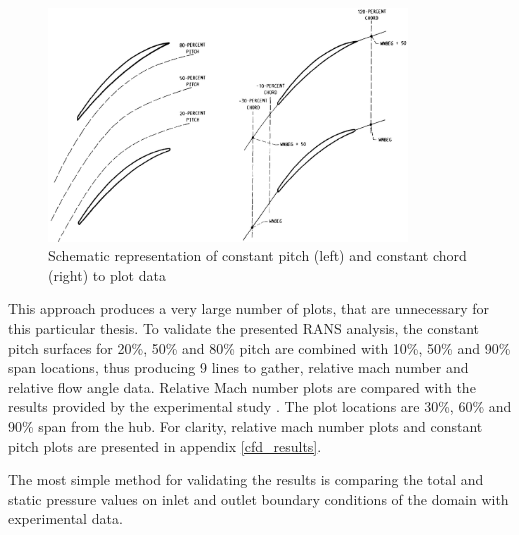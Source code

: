 \begin{figure}[h!]
\centering %
\includegraphics[width=0.85\textwidth]{Pictures/LA.png}
\caption{Schematic representation of constant pitch (left) and constant chord (right) to plot data \citep{r67laser}}
\label{fig_LA}
\end{figure}

This approach produces a very large number of plots, that are unnecessary for this particular thesis. To validate the presented RANS analysis, the constant pitch surfaces for 20\%, 50\% and 80\% pitch are combined with 10\%, 50\% and 90\% span locations, thus producing 9 lines to gather, relative mach number and relative flow angle data. Relative Mach number plots are compared with the results provided by the experimental study \citep{r67laser}. The plot locations are 30\%, 60\% and 90\% span from the hub. For clarity, relative mach number plots and constant pitch plots are presented in appendix \ref{cfd_results}.

The most simple method for validating the results is comparing the total and static pressure values on inlet and outlet boundary conditions of the domain with experimental data.